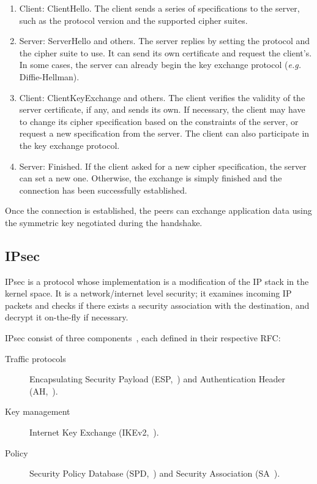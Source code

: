 \begin{enumerate}
	\item Client: ClientHello. The client sends a series of specifications to the server, such as the protocol version and the supported cipher suites.
	\item Server: ServerHello and others. The server replies by setting the protocol and the cipher suite to use.
	It can send its own certificate and request the client's.
	In some cases, the server can already begin the key exchange protocol (\textit{e.g.} Diffie-Hellman).
	\item Client: ClientKeyExchange and others. The client verifies the validity of the server certificate, if any, and sends its own. If necessary, the client may have to change its cipher specification based on the constraints of the server, or request a new specification from the server.
	The client can also participate in the key exchange protocol.
	\item Server: Finished. If the client asked for a new cipher specification, the server can set a new one. Otherwise, the exchange is simply finished and the connection has been successfully established.
\end{enumerate}

Once the connection is established, the peers can exchange application data using the symmetric key negotiated during the handshake.








\subsection{IPsec}
IPsec is a protocol whose implementation is a modification of the IP stack in the kernel space.
It is a network/internet level security; it examines incoming IP packets and checks if there exists a security association with the destination, and decrypt it on-the-fly if necessary.


IPsec consist of three components~\cite{cryptoencyclopedia2011}, each defined in their respective RFC:
\begin{description}
	\item[Traffic protocols] Encapsulating Security Payload (ESP,~\cite{rfc4303}) and Authentication Header (AH,~\cite{rfc4302}).
	\item[Key management] Internet Key Exchange (IKEv2,~\cite{rfc7296}).
	\item[Policy]Security Policy Database (SPD,~\cite{rfc4301}) and Security Association (SA~\cite{rfc4301}).
\end{description}

